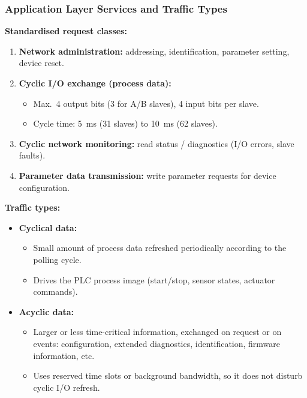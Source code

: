 \begin{frame}
	\frametitle{Application Layer Services and Traffic Types}
	\textbf{Standardised request classes:}
	\begin{enumerate}
		\item \textbf{Network administration:} addressing, identification, parameter setting, device reset.
		\item \textbf{Cyclic I/O exchange (process data):}
		\begin{itemize}
			\item Max.\ 4 output bits (3 for A/B slaves), 4 input bits per slave.
			\item Cycle time: \SI{5}{ms} (31 slaves) to \SI{10}{ms} (62 slaves).
		\end{itemize}
		\item \textbf{Cyclic network monitoring:} read status / diagnostics (I/O errors, slave faults).
		\item \textbf{Parameter data transmission:} write parameter requests for device configuration.
	\end{enumerate}
	\vspace{0.2cm}
	\textbf{Traffic types:}
	\begin{itemize}
		\item \textbf{Cyclical data:}
		\begin{itemize}
			\item Small amount of process data refreshed periodically according to the polling cycle.
			\item Drives the PLC process image (start/stop, sensor states, actuator commands).
		\end{itemize}
		\item \textbf{Acyclic data:}
		\begin{itemize}
			\item Larger or less time-critical information, exchanged on request or on events:
				configuration, extended diagnostics, identification, firmware information, etc.
			\item Uses reserved time slots or background bandwidth, so it does not disturb cyclic I/O refresh.
		\end{itemize}
	\end{itemize}
\end{frame}

